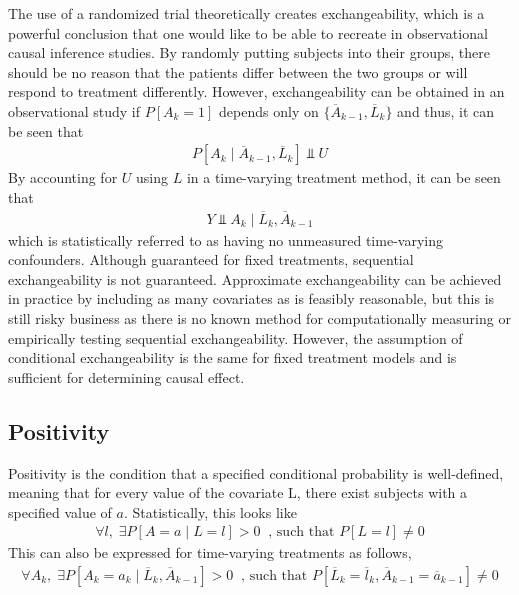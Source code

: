 The use of a randomized trial theoretically creates exchangeability, which is a powerful conclusion that one would like to be able to recreate in observational causal inference studies.   By randomly putting subjects into their groups, there should be no reason that the patients differ between the two groups or will respond to treatment differently.  However, exchangeability can be obtained in an observational study if $P[A_k = 1]$ depends only on $\{\overline{A}_{k-1}, \overline{L}_{k} \}$ and thus, it can be seen that 
\begin{align}
P[A_k \mid \overline{A}_{k-1}, \overline{L}_{k} ] \Perp U
\end{align}
By accounting for $U$ using $L$ in a time-varying treatment method, it can be seen that 
\begin{align} 
Y \Perp A_k \mid  \overline{L}_{k}, \overline{A}_{k-1}
\end{align}
which is statistically referred to as having no unmeasured time-varying confounders.  Although guaranteed for fixed treatments, sequential exchangeability is not guaranteed.\cite{wright2015international}  Approximate exchangeability can be achieved in practice by including as many covariates as is feasibly reasonable, but this is still risky business as there is no known method for computationally measuring or empirically testing sequential exchangeability.  However, the assumption of conditional exchangeability is the same for fixed treatment models and is sufficient for determining causal effect. 

      
\subsection{Positivity} 
Positivity is the condition that a specified conditional probability is well-defined, meaning that for every value of the covariate L, there exist subjects with a specified value of $a$.\cite{hernan2006estimating}  Statistically, this looks like 
\begin{align}
\forall l, \;  \exists P[A=a \mid L=l] > 0 \;\;  \text{, such that } P[L=l] \neq 0
\end{align} 
This can also be expressed for time-varying treatments as follows, 
\begin{align} 
\forall A_k, \; \exists P[A_k = a_k \mid \overline{L}_{k}, \overline{A}_{k-1}] > 0 \;\;   \text{, such that } P[\overline{L}_k = \overline{l}_k, \overline{A}_{k-1} = \overline{a}_{k-1} ] \neq 0
\end{align} 


